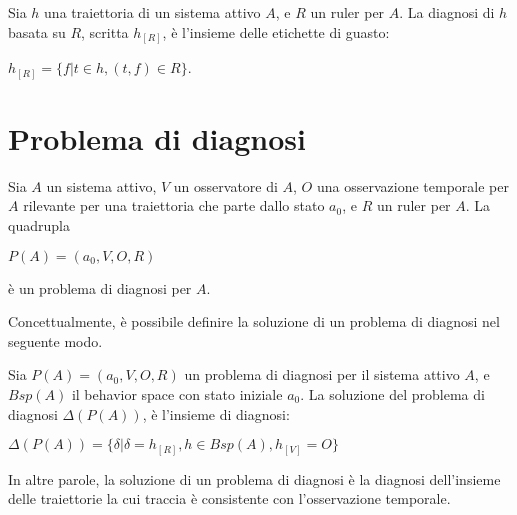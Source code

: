 \begin{defn}
Sia $h$ una traiettoria di un sistema attivo $A$, e $R$ un ruler per $A$. La diagnosi di $h$ basata su $R$, scritta $h_{[R]}$, è l'insieme delle etichette di guasto:
\begin{center}
	$h_{[R]} = \{ f | t \in h, (t,f) \in R \}$.
\end{center}
\end{defn}

\section{Problema di diagnosi}
\begin{defn}
Sia $A$ un sistema attivo, $V$ un osservatore di $A$, $O$ una osservazione temporale per $A$ rilevante per una traiettoria che parte dallo stato $a_0$, e $R$ un ruler per $A$. La quadrupla
\begin{center}
	$P(A) = (a_0,V,O,R)$
\end{center}
è un problema di diagnosi per $A$.
\end{defn}
Concettualmente, è possibile definire la soluzione di un problema di diagnosi nel seguente modo.
\begin{defn}
Sia $P(A) = (a_0,V,O,R)$ un problema di diagnosi per il sistema attivo $A$, e $Bsp(A)$ il behavior space con stato iniziale $a_0$. La soluzione del problema di diagnosi $\Delta(P(A))$, è l'insieme di diagnosi:
\begin{center}
	$\Delta(P(A)) = \{ \delta | \delta = h_{[R]}, h \in Bsp(A), h_{[V]} = O\}$
\end{center}
\end{defn}
In altre parole, la soluzione di un problema di diagnosi è la diagnosi dell'insieme delle traiettorie la cui traccia è consistente con l'osservazione temporale.

